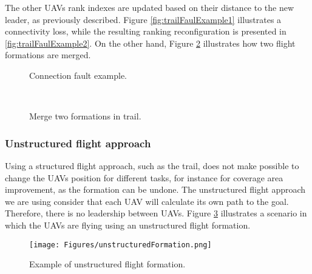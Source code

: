 The other UAVs rank indexes are updated based on their distance to the new leader, as previously described. Figure  \ref{fig:trailFaulExample1} illustrates a connectivity loss, while the resulting ranking reconfiguration is presented in \ref{fig:trailFaulExample2}. On the other hand, Figure \ref{fig:MergeFormations} illustrates how two flight formations are merged.

\begin{figure}[h!]
      \centering            
      \caption{Connection fault example.}     
      \label{fig:trailFaulExample}
\end{figure}

\begin{figure}[h!]
      \centering            
           \\
      \caption{Merge two formations in trail.}     
      \label{fig:MergeFormations}
\end{figure}

\subsubsection{Unstructured flight approach}

Using a structured flight approach, such as the trail, does not make possible to change the UAVs position for different tasks, for instance for coverage area improvement, as the formation can be undone. The unstructured flight approach we are using consider that each UAV will calculate its own path to the goal. Therefore, there is no leadership between UAVs. Figure \ref{fig:unstructuredFlightFormation} illustrates a scenario in which the UAVs are flying using an unstructured flight formation. 

\begin{figure}[ht]
\centering
\texttt{[image: Figures/unstructuredFormation.png]}
\caption{Example of unstructured flight formation.}
\label{fig:unstructuredFlightFormation}
\end{figure}

